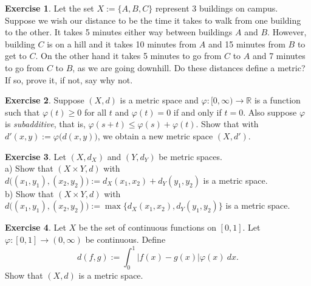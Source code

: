 \documentclass[12pt]{book}
\newcommand{\abs}[1]{\left\lvert {#1} \right\rvert}
\newcommand{\R}{{\mathbb{R}}}
\newcommand{\myindex}[1]{#1\index{#1}}
\theoremstyle{plain}
\theoremstyle{remark}
\theoremstyle{definition}
\theoremstyle{exercise}
\newtheorem{exercise}{Exercise}[section]
\theoremstyle{example}
\begin{document}
\begin{exercise}
Let the set $X := \{ A, B, C \}$ represent 3 buildings on campus.  Suppose we
wish our distance to be the time it takes to walk from one building to
the other.
It takes 5 minutes either way between buildings $A$ and $B$.  However,
building $C$ is on a hill and it takes 10 minutes from $A$ and 15 minutes
from $B$ to get to $C$.  On the other hand it takes 5 minutes to go
from $C$ to $A$ and 7 minutes to go from $C$ to $B$, as we are going
downhill.  Do these distances define a metric?  If so, prove it, if not, say
why not.
\end{exercise}

\begin{exercise}
Suppose $(X,d)$ is a metric space and
$\varphi \colon [0,\infty) \to \R$ is
a function such that 
$\varphi(t) \geq 0$ for all $t$ and $\varphi(t) = 0$ if and only if
$t=0$.  Also suppose $\varphi$ is \emph{\myindex{subadditive}},
that is, $\varphi(s+t) \leq \varphi(s)+\varphi(t)$.
Show that with $d'(x,y) := \varphi\bigl(d(x,y)\bigr)$, we obtain a new
metric space $(X,d')$.
\end{exercise}

\begin{exercise} \label{exercise:mscross}
Let $(X,d_X)$ and $(Y,d_Y)$ be metric spaces.\\
a) Show that $(X \times Y,d)$ with
$d\bigl( (x_1,y_1), (x_2,y_2) \bigr) := d_X(x_1,x_2) + d_Y(y_1,y_2)$ is
a metric space. \\
b) Show that $(X \times Y,d)$ with
$d\bigl( (x_1,y_1), (x_2,y_2) \bigr) := \max \{ d_X(x_1,x_2) , d_Y(y_1,y_2) \}$ is
a metric space.
\end{exercise}

\begin{exercise}
Let $X$ be the set of continuous functions on $[0,1]$.  Let $\varphi \colon
[0,1] \to (0,\infty)$ be continuous.  Define
\begin{equation*}
d(f,g) := \int_0^1 \abs{f(x)-g(x)}\varphi(x)~dx .
\end{equation*}
Show that $(X,d)$ is a metric space.
\end{exercise}

\pagebreak[2]
\end{document}
